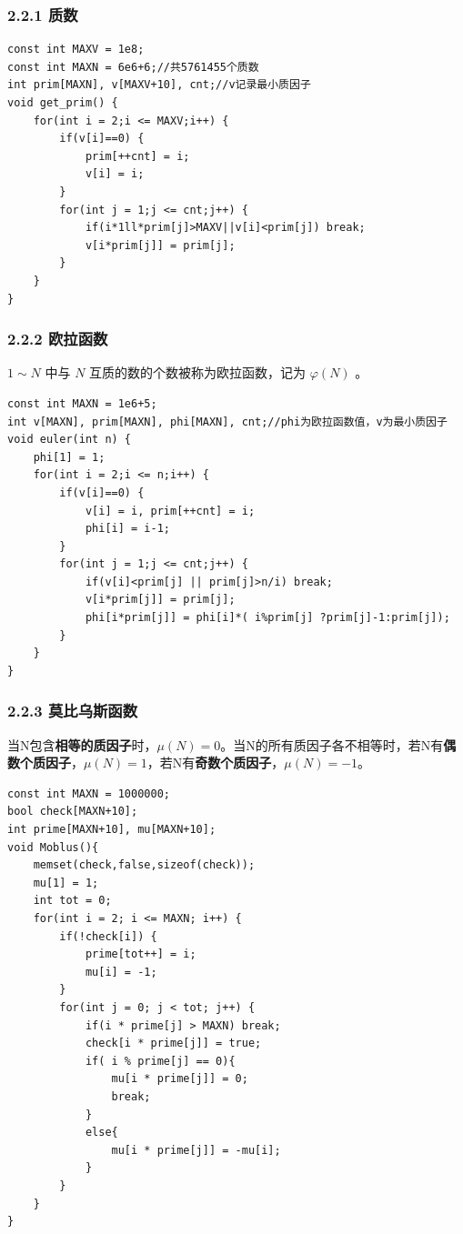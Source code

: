 \documentclass[11pt]{article}		%
\begin{document}
\subsubsection{2.2.1 质数}\label{ux8d28ux6570}

\begin{verbatim}
const int MAXV = 1e8;
const int MAXN = 6e6+6;//共5761455个质数
int prim[MAXN], v[MAXV+10], cnt;//v记录最小质因子
void get_prim() {
    for(int i = 2;i <= MAXV;i++) {
        if(v[i]==0) {
            prim[++cnt] = i;
            v[i] = i;
        }
        for(int j = 1;j <= cnt;j++) {
            if(i*1ll*prim[j]>MAXV||v[i]<prim[j]) break;
            v[i*prim[j]] = prim[j];
        }
    }
}
\end{verbatim}

\subsubsection{2.2.2 欧拉函数}\label{ux6b27ux62c9ux51fdux6570}

\(1 \sim N\) 中与 \(N\) 互质的数的个数被称为欧拉函数，记为
\(\varphi(N)\) 。

\begin{verbatim}
const int MAXN = 1e6+5;
int v[MAXN], prim[MAXN], phi[MAXN], cnt;//phi为欧拉函数值，v为最小质因子
void euler(int n) {
    phi[1] = 1;
    for(int i = 2;i <= n;i++) {
        if(v[i]==0) {
            v[i] = i, prim[++cnt] = i;
            phi[i] = i-1;
        }
        for(int j = 1;j <= cnt;j++) {
            if(v[i]<prim[j] || prim[j]>n/i) break;
            v[i*prim[j]] = prim[j];
            phi[i*prim[j]] = phi[i]*( i%prim[j] ?prim[j]-1:prim[j]);
        }
    }
}
\end{verbatim}

\subsubsection{2.2.3
莫比乌斯函数}\label{ux83abux6bd4ux4e4cux65afux51fdux6570}

当N包含\textbf{相等的质因子}时，\(\mu (N) = 0\)。当N的所有质因子各不相等时，若N有\textbf{偶数个质因子}，\(\mu(N) = 1\)，若N有\textbf{奇数个质因子}，\(\mu (N) = -1\)。

\begin{verbatim}
const int MAXN = 1000000;
bool check[MAXN+10];
int prime[MAXN+10], mu[MAXN+10];
void Moblus(){
    memset(check,false,sizeof(check));
    mu[1] = 1;
    int tot = 0;
    for(int i = 2; i <= MAXN; i++) {
        if(!check[i]) {
            prime[tot++] = i;
            mu[i] = -1;
        }
        for(int j = 0; j < tot; j++) {
            if(i * prime[j] > MAXN) break;
            check[i * prime[j]] = true;
            if( i % prime[j] == 0){
                mu[i * prime[j]] = 0;
                break;
            }
            else{
                mu[i * prime[j]] = -mu[i];
            }
        }
    }
}
\end{verbatim}
\end{document}
